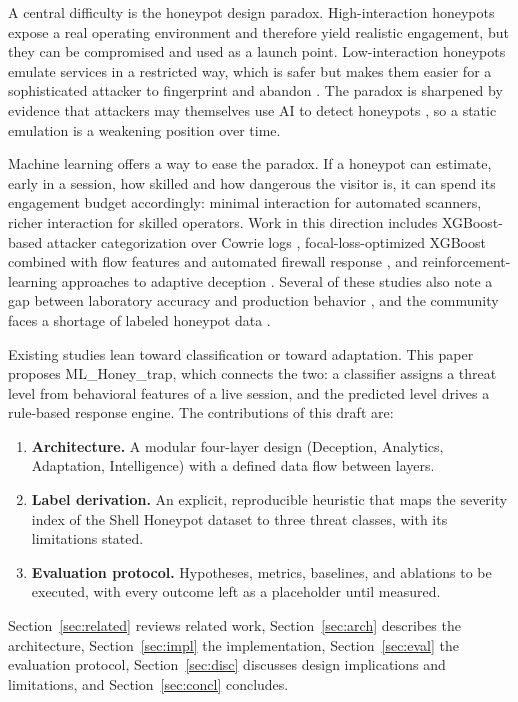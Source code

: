 \documentclass[conference]{IEEEtran}
\newcommand{\sys}{ML\_Honey\_trap}
\begin{document}
A central difficulty is the honeypot design paradox. High-interaction honeypots expose a real operating environment and therefore yield realistic engagement, but they can be compromised and used as a launch point. Low-interaction honeypots emulate services in a restricted way, which is safer but makes them easier for a sophisticated attacker to fingerprint and abandon \cite{ref1,ref12}. The paradox is sharpened by evidence that attackers may themselves use AI to detect honeypots \cite{ref8}, so a static emulation is a weakening position over time.

Machine learning offers a way to ease the paradox. If a honeypot can estimate, early in a session, how skilled and how dangerous the visitor is, it can spend its engagement budget accordingly: minimal interaction for automated scanners, richer interaction for skilled operators. Work in this direction includes XGBoost-based attacker categorization over Cowrie logs \cite{ref1}, focal-loss-optimized XGBoost combined with flow features and automated firewall response \cite{ref2}, and reinforcement-learning approaches to adaptive deception \cite{ref3,ref7,ref8}. Several of these studies also note a gap between laboratory accuracy and production behavior \cite{ref1}, and the community faces a shortage of labeled honeypot data \cite{ref12}.

Existing studies lean toward classification or toward adaptation. This paper proposes \sys, which connects the two: a classifier assigns a threat level from behavioral features of a live session, and the predicted level drives a rule-based response engine. The contributions of this draft are:
\begin{enumerate}
\item \textbf{Architecture.} A modular four-layer design (Deception, Analytics, Adaptation, Intelligence) with a defined data flow between layers.
\item \textbf{Label derivation.} An explicit, reproducible heuristic that maps the severity index of the Shell Honeypot dataset \cite{ref10} to three threat classes, with its limitations stated.
\item \textbf{Evaluation protocol.} Hypotheses, metrics, baselines, and ablations to be executed, with every outcome left as a placeholder until measured.
\end{enumerate}
Section~\ref{sec:related} reviews related work, Section~\ref{sec:arch} describes the architecture, Section~\ref{sec:impl} the implementation, Section~\ref{sec:eval} the evaluation protocol, Section~\ref{sec:disc} discusses design implications and limitations, and Section~\ref{sec:concl} concludes.
\end{document}
